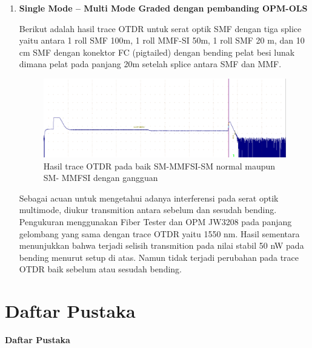 \documentclass[12pt]{article}
\begin{document}
\begin{enumerate}
		\item \textbf{Single Mode – Multi Mode Graded dengan pembanding OPM-OLS}
		
		Berikut adalah hasil trace OTDR untuk serat optik SMF dengan tiga splice yaitu antara 1 roll SMF 100m, 1 roll MMF-SI 50m, 1 roll SMF 20 m, dan 10 cm SMF dengan konektor FC (pigtailed) dengan bending pelat besi lunak dimana pelat pada panjang 20m setelah splice  antara SMF dan MMF. 
		
		\begin{figure}[h!]
			\centering
			\captionsetup{justification=centering}
			\includegraphics[width=0.5\linewidth]{images/Bab_4/Bab_4_3g1}
			\caption[Trace SM-MMFSI-SM ]{\small{Hasil trace OTDR pada baik SM-MMFSI-SM normal maupun SM- MMFSI dengan gangguan}}
		\end{figure}
	
		Sebagai acuan untuk mengetahui adanya interferensi pada serat optik multimode, diukur transmition antara sebelum dan sesudah bending. 
		Pengukuran menggunakan Fiber Tester dan OPM JW3208 pada panjang gelombang yang sama dengan trace OTDR yaitu 1550 nm.
		Hasil sementara menunjukkan bahwa terjadi selisih transmition pada nilai stabil 50 nW pada bending menurut setup di atas.
		Namun tidak terjadi perubahan pada trace OTDR baik sebelum atau sesudah bending. 
	
	\end{enumerate}

\newpage

	\section{Daftar Pustaka}
	
	\begin{center}
		\textbf{Daftar Pustaka}
	\end{center}
	
	
	

	
\end{document}
